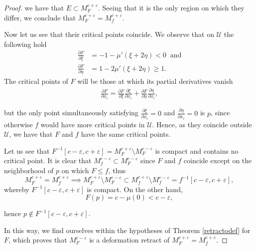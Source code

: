 \begin{proof}
    we have that $E\subset M_F^{c+\varepsilon}$. Seeing that it is the only region on which they differ, we conclude that $M_F^{c+\varepsilon}=M_f^{c+\varepsilon}$.

    \medskip

    Now let us see that their critical points coincide. We observe that on $\mathcal{U}$ the following hold
    \begin{align*}
        \frac{\partial F}{\partial \xi}&=-1-\mu'(\xi + 2\eta)<0 ~\text{ and}\\
        \frac{\partial F}{\partial \eta}&=1-2\mu'(\xi+2\eta)\ge 1.
    \end{align*}
    The critical points of $F$ will be those at which its partial derivatives vanish
    \begin{align*}
        \frac{\partial F}{\partial x_i}=\frac{\partial F}{\partial \xi}\frac{\partial \xi}{\partial x_i} + \frac{\partial F}{\partial \eta}\frac{\partial \eta}{\partial x_i},
    \end{align*}

    but the only point simultaneously satisfying $\frac{\partial \xi}{\partial x_i}=0$ and $\frac{\partial \eta}{\partial x_i}=0$ is $p$, since otherwise $f$ would have more critical points in $\mathcal{U}$. Hence, as they coincide outside $\mathcal{U}$, we have that $F$ and $f$ have the same critical points.

    \medskip

    Let us see that $F^{-1}[c-\varepsilon,c+\varepsilon]=M^{c+\varepsilon}_F\setminus M^{c-\varepsilon}_F$ is compact and contains no critical point. It is clear that $M^{c-\varepsilon}_f\subset M^{c-\varepsilon}_F$ since $F$ and $f$ coincide except on the neighborhood of $p$ on which $F\le f$, thus
    \begin{equation*}
        M^{c+\varepsilon}_F=M^{c+\varepsilon}_f\implies M^{c+\varepsilon}_F\setminus M^{c-\varepsilon}_F \subset M^{c+\varepsilon}_f\setminus M^{c-\varepsilon}_f=f^{-1}[c-\varepsilon,c+\varepsilon],
    \end{equation*}
    whereby $F^{-1}[c-\varepsilon,c+\varepsilon]$ is compact. On the other hand,
    \begin{equation*}
        F(p)=c-\mu(0)<c-\varepsilon,
    \end{equation*}

    hence $p\notin F^{-1}[c-\varepsilon,c+\varepsilon]$.

    \medskip

    In this way, we find ourselves within the hypotheses of Theorem \ref{retractodef} for $F$, which proves that $M^{c-\varepsilon}_F$ is a deformation retract of $M^{c+\varepsilon}_F=M^{c+\varepsilon}_f$.


\end{proof}
